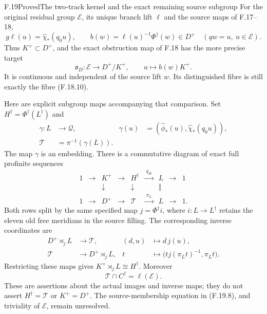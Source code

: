\begin{claim}{F.19}{Proved}{The two-track kernel and the exact remaining source subgroup}
For the original residual group \(\mathcal E\), its unique
branch lift \(\ell\) and the source maps of F.17--18,
\[
 g\ell(u)=\widehat\chi_*(q_0u),\qquad
 b(w)=\ell(u)^{-1}\Phi^\dagger(w)\in D^+
               \quad(qw=u,\ u\in\mathcal E).
                                                               \tag{F.19.7}
\]
Thus \(K^+\subset D^+\), and the exact obstruction map of F.18
has the more precise target
\[
 \mathfrak o_D:\mathcal E\longrightarrow D^+/K^+,\qquad
                 u\longmapsto b(w)K^+ .
                                                               \tag{F.19.8}
\]
It is continuous and independent of the source lift \(w\).
Its distinguished fibre is still exactly the fibre
(F.18.10).

Here are explicit subgroup maps accompanying that comparison.
Set \(H^\dagger=\Phi^\dagger(L^\dagger)\) and
\[
 \begin{aligned}
 \gamma:L&\longrightarrow\mathcal Q,&
       \gamma(u)&=(\widehat\phi_*(u),\widehat\chi_*(q_0u)),\\
 \mathcal T&=\pi^{-1}(\gamma(L)).
 \end{aligned}                                                 \tag{F.19.9}
\]
The map \(\gamma\) is an embedding.  There is a commutative
diagram of exact full profinite sequences
\[
 \begin{array}{ccccccccc}
 1&\longrightarrow&K^+&\longrightarrow&H^\dagger
     &\xrightarrow{\ q_H\ }&L&\longrightarrow&1\\
 &&\downarrow&&\downarrow&&\Vert\\
 1&\longrightarrow&D^+&\longrightarrow&\mathcal T
     &\xrightarrow{\ \pi_L\ }&L&\longrightarrow&1 .
 \end{array}                                                   \tag{F.19.10}
\]
Both rows split by the same specified map
\(j=\Phi^\dagger i\), where \(i:L\to L^\dagger\) retains
the eleven old free meridians in the source filling.
The corresponding inverse coordinates are
\[
 \begin{aligned}
 D^+\rtimes_j L&\longrightarrow\mathcal T,
       &(d,u)&\longmapsto d\,j(u),\\
 \mathcal T&\longrightarrow D^+\rtimes_j L,
       &t&\longmapsto
          \bigl(tj(\pi_Lt)^{-1},\pi_Lt\bigr).
 \end{aligned}                                                 \tag{F.19.11}
\]
Restricting these maps gives \(K^+\rtimes_jL\cong H^\dagger\).
Moreover
\[
                  \mathcal T\cap C^\dagger=\ell(\mathcal E).
                                                               \tag{F.19.12}
\]
These are assertions about the actual images and inverse maps;
they do not assert \(H^\dagger=\mathcal T\) or \(K^+=D^+\).
The source-membership equation in (F.19.8), and triviality
of \(\mathcal E\), remain unresolved.
\end{claim}

